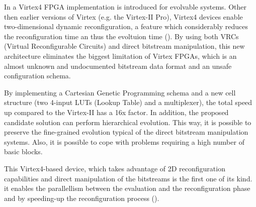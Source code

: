 
In \cite{virtex4} a Virtex4 FPGA implementation is introduced for evolvable systems. Other then earlier versions of Virtex (e.g. the Virtex-II Pro), Virtex4 devices enable two-dimensional dynamic reconfiguration, a feature which considerably reduces the reconfiguration time an thus the evoltuion time (\cite{virtex4}). By using both VRCs (Virtual Reconfigurable Circuits) and direct bitstream manipulation, this new architecture eliminates the biggest limitation of Virtex FPGAs, which is an almost unknown and undocumented bitstream data format and an unsafe configuration schema. 

By implementing a Cartesian Genetic Programming schema and a new cell structure (two 4-input LUTs (Lookup Table) and a multiplexer), the total speed up compared to the Virtex-II has a 16x factor. In addition, the  proposed candidate solution can perform hierarchical evolution. This way, it is possible to preserve the fine-grained evolution typical of the direct bitstream manipulation systems. Also, it is possible to cope with problems requiring a high number of basic blocks.

This Virtex4-based device, which takes advantage of 2D reconfiguration capabilities and direct manipulation of the bitstreams is the first one of its kind. it enables the parallellism between the evaluation and the reconfiguration phase and by speeding-up the reconfiguration process (\cite{virtex4}).